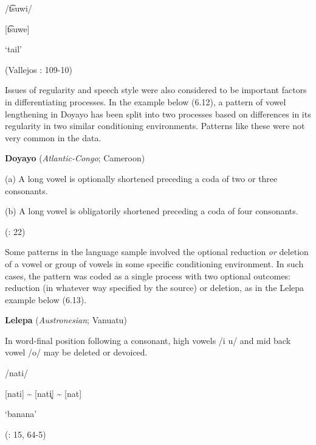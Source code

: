 /t͡suwi/



[t͡suwe]



‘tail’



(Vallejos \citealt{Yopán2010}: 109{}-10)
\z



  Issues of regularity and speech style were also considered to be important factors in differentiating processes. In the example below (6.12), a pattern of vowel lengthening in Doyayo has been split into two processes based on differences in its regularity in two similar conditioning environments. Patterns like these were not very common in the data.



\ea\label{ex:(6.12)}
   \textbf{Doyayo} (\textit{Atlantic-Congo}; Cameroon)



(a)  A long vowel is optionally shortened preceding a coda of two or three consonants.



(b)   A long vowel is obligatorily shortened preceding a coda of four consonants.



(\citealt{WieringWiering1994}: 22)
\z



  Some patterns in the language sample involved the optional reduction \textit{or} deletion of a vowel or group of vowels in some specific conditioning environment. In such cases, the pattern was coded as a single process with two optional outcomes: reduction (in whatever way specified by the source) or deletion, as in the Lelepa example below (6.13).



\ea\label{ex:(6.13)}
   \textbf{Lelepa} (\textit{Austronesian}; Vanuatu)



In word-final position following a consonant, high vowels /i u/ and mid back vowel /o/ may be deleted or devoiced.



/nati/



[nati] {\textasciitilde} [nati̥] {\textasciitilde} [nat]



‘banana’



(\citealt{Lacrampe2014}: 15, 64-5)

